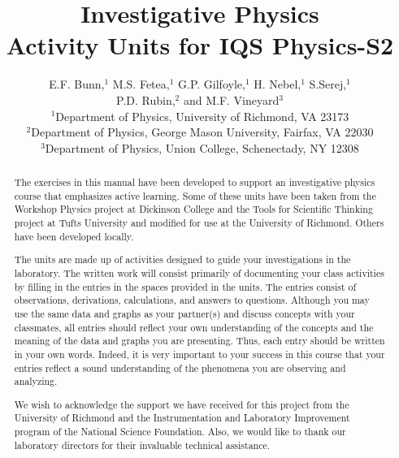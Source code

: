 \documentclass[twoside]{article}
\begin{document}
\title{Investigative Physics\\ Activity Units for IQS Physics-S2}


\author{E.F. Bunn,$^1$ M.S. Fetea,$^1$
G.P. Gilfoyle,$^1$ H. Nebel,$^1$ S.Serej,$^1$ \\ P.D. Rubin,$^2$ and M.F. Vineyard$^3$\\[8pt]
$^1$Department of Physics, University of Richmond, VA 23173 \\[4pt]
$^2$Department of Physics, George Mason University, Fairfax, VA  22030 \\[4pt]
$^3$Department of Physics, Union College, Schenectady, NY 12308}

\maketitle
\begin{abstract}
The exercises in this manual have been developed to support an investigative
physics course that emphasizes active learning. Some of these units have been
taken from the Workshop Physics project at Dickinson College and the Tools for
Scientific Thinking project at Tufts University and modified for use at the
University of Richmond. Others have been developed locally.

The units are made up of activities designed to guide your investigations in
the laboratory. The written work will consist primarily of documenting your
class activities by filling in the entries in the spaces provided in the units.
The entries consist of observations, derivations, calculations, and answers
to questions. Although you may use the same data and graphs as your partner(s)
and discuss concepts with your classmates, all entries should reflect your own
understanding of the concepts and the meaning of the data and graphs you are
presenting. Thus, each entry should be written in your own words. Indeed, it
is very important to your success in this course that your entries reflect a
sound understanding of the phenomena you are observing and analyzing.

We wish to acknowledge the support we have received for this project from the
University of Richmond and the Instrumentation and Laboratory Improvement program 
of the National Science Foundation. Also, we would like to thank our laboratory 
directors for their invaluable technical assistance.
\end{abstract}
\end{document}
